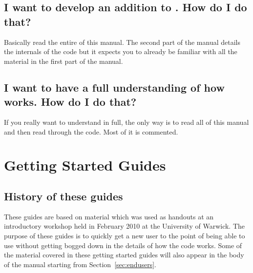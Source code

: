 \documentclass[12pt,a4paper]{article}
\newcommand{\sect}[1]{Section~\ref{sec:#1}}
\newcommand{\EPOCH}{{\color{warwickdark}\fontfamily{phv}\selectfont{EPOCH}}}
\begin{document}
\subsection{I want to develop an addition to {\EPOCH}. How do I do that?}
Basically read the entire of this manual. The second part of the manual details
the internals of the code but it expects you to already be familiar with all
the material in the first part of the manual.

\subsection{I want to have a full understanding of how {\EPOCH} works. How do I
  do that?}
If you really want to understand {\EPOCH}
in full, the only way is to read all of
this manual and then read through the code. Most of it is commented.
\pagebreak

\section{Getting Started Guides}
\label{sec:gettingstarted}

\subsection{History of these guides}
These guides are based on material which was used as handouts at an {\EPOCH}
introductory workshop held in February 2010 at the University of Warwick. The
purpose of these guides is to quickly get a new user to the point of being able
to use {\EPOCH} without getting bogged down in the details of how the code
works. Some of the material covered in these getting started guides will also
appear in the body of the manual starting from \sect{endusers}.
\end{document}
